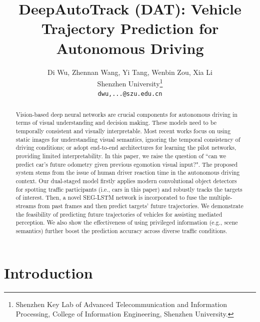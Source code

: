 \documentclass[10pt,twocolumn,letterpaper]{article}
\begin{document}
\title{DeepAutoTrack (DAT): Vehicle Trajectory Prediction for Autonomous Driving}

\author{Di Wu, Zhennan Wang, Yi Tang,  Wenbin Zou, Xia Li\\
Shenzhen University\thanks{Shenzhen Key Lab of Advanced Telecommunication and Information Processing, College of Information Engineering, Shenzhen University.}\\
{\tt\small dwu,...@szu.edu.cn}}
\maketitle
\begin{abstract}

Vision-based deep neural networks are crucial components for autonomous driving in terms of visual understanding and decision making.
These models need to be temporally consistent and visually interpretable.
Most recent works focus on using static images for understanding visual semantics, ignoring the temporal consistency of driving conditions; or adopt end-to-end architectures for learning the pilot networks, providing limited interpretability.
In this paper, we raise the question of ``can we predict car's future odometry given previous egomotion visual input?".
The proposed system stems from the issue of human driver reaction time in the autonomous driving context.
Our dual-staged model firstly applies modern convolutional object detectors for spotting traffic participants (i.e., cars in this paper) and robustly tracks the targets of interest.
Then, a novel SEG-LSTM network is incorporated to fuse the multiple-streams from past frames and then predict targets' future trajectories.
We demonstrate the feasibility of predicting future trajectories of vehicles for assisting mediated perception.
 We also show the effectiveness of using privileged information (e.g., scene semantics) further boost the prediction accuracy across diverse traffic conditions.
\end{abstract}
\section{Introduction}
\end{document}
